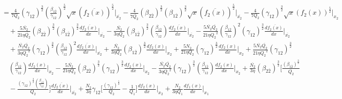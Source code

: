 \documentclass[fleqn, 10pt]{article}
\begin{document}
                           \begin{equation*}
                            \begin{split}
                                & =   \frac{4}{7Q_2} (\gamma_{12})^\frac{3}{2} \left(\frac{\beta_{1\overline{2}}}{\gamma_{12}}\right)^\frac{5}{2} \sqrt{x} (\overline{f_2(x)})^\frac{5}{2} \Bigg|_{\overline{x_2}} -   \frac{4}{7 \overline{Q_2}} (\beta_{2\overline{2}})^\frac{3}{2} (\beta_{1\overline{2}})^\frac{3}{2} \sqrt{x} (\overline{f_2(x)})^\frac{5}{2} \Bigg|_{\overline{x_2}} -  \frac{4}{7 Q_2} (\gamma_{12})^\frac{3}{2} \sqrt{x} (f_2(x))^\frac{5}{2} \Bigg|_{x_2} \\ & \quad +   \frac{5 \overline{N_2}}{21 \eta \overline{Q_2}} (\beta_{2\overline{2}})^\frac{3}{2} (\beta_{1\overline{2}})^\frac{3}{2} \frac{d\overline{f_2(x)}}{dx} \Bigg|_{\overline{x_2}}  -   \frac{\overline{N_2}}{3 \eta Q_2} (\beta_{1\overline{2}})^\frac{3}{2} \left(\frac{\beta_{1\overline{2}}}{\gamma_{12}}\right) \frac{d\overline{f_2(x)}}{dx} \Bigg|_{\overline{x_2}} -    \frac{5 \overline{N_2} \overline{Q_2}}{21 \eta {Q_2}^2} \left(\frac{\beta_{1\overline{2}}}{\gamma_{12}}\right)^2 (\gamma_{12})^\frac{3}{2} \frac{d\overline{f_2(x)}}{dx} \Bigg|_{\overline{x_2}} \\ & \quad +  \frac{\overline{N_2} \overline{Q_2}}{3 \eta {Q_2}^2} (\gamma_{12})^\frac{3}{2} \left(\frac{\beta_{1\overline{2}}}{\gamma_{12}}\right)^2 \frac{d\overline{f_2(x)}}{dx} \Bigg|_{\overline{x_2}} +  \frac{\overline{N_2}}{3 \eta Q_2} (\beta_{1\overline{2}})^\frac{3}{2} \frac{df_2(x)}{dx} \Bigg|_{x_2} +  \frac{5 N_2}{21 \eta Q_2} (\gamma_{12})^\frac{3}{2} \frac{df_2(x)}{dx} \Bigg|_{x_2}  +   \frac{5 \overline{N_2} \overline{Q_2}}{21 \eta {Q_2}^2} (\gamma_{12})^\frac{3}{2}  \\ & \quad \left(\frac{\beta_{1\overline{2}}}{\gamma_{12}}\right) \frac{df_2(x)}{dx} \Bigg|_{x_2}-  \frac{5 \overline{N_2}}{21 \eta Q_2} (\beta_{2\overline{2}})^\frac{3}{2} (\gamma_{12})^\frac{3}{2} \frac{df_2(x)}{dx} \Bigg|_{x_2} -   \frac{\overline{N_2} \overline{Q_2}}{3 \eta {Q_2}^2} (\gamma_{12})^\frac{3}{2} \left(\frac{\beta_{1\overline{2}}}{\gamma_{12}}\right) \frac{df_2(x)}{dx} \Bigg|_{x_2} + \frac{\overline{N_2}}{3 \eta} (\beta_{2\overline{2}})^\frac{3}{2} \Biggl[ \frac{(\beta_{1\overline{2}})^\frac{3}{2}}{\overline{Q_2}} \\ & \quad -   \frac{(\gamma_{12})^\frac{3}{2} \left(\frac{\beta_{1\overline{2}}}{\gamma_{12}}\right)}{Q_2} \Biggr] \frac{d\overline{f_2(x)}}{dx} \Bigg|_{\overline{x_2}}  + \frac{N_2}{3 \eta} \gamma_{12} \biggl[ \frac{(\gamma_{12})^\frac{1}{2}}{Q_2} -   \frac{1}{Q_1} \biggr] \frac{df_2(x)}{dx} \Bigg|_{x_2} +   \frac{N_2}{3 \eta Q_1} \frac{df_1(x)}{dx} \Bigg|_{x_1}
                                \end{split}
                            \end{equation*}
\end{document}

